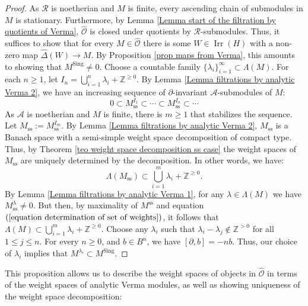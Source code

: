 \documentclass{amsart}
\newcommand{\OX}{\mathcal{O}}
\begin{document}
\begin{proof}
As $\mathscr{R}$ is noetherian and $M$ is finite, every ascending chain of submodules in $M$ is stationary. Furthermore, by Lemma \ref{Lemma start of the filtration by quotients of Verma}, $\widehat{\OX}$ is closed under quotients by $\mathscr{R}$-submodules. Thus, it suffices to show that for every $M\in \widehat{\OX}$ there is some $W\in\operatorname{Irr}(H)$ with a non-zero map $\widehat{\Delta}(W)\rightarrow M$. By Proposition \ref{prop maps from Verma}, this amounts to showing that $M^{\operatorname{Sing}}\neq 0$. Choose a countable family $\{\lambda_i\}_{i=1}^{\infty}\subset \Lambda(M)$. For each $n\geq 1$, let $I_n=\bigcup_{i=1}^n\lambda_i+ \mathbb{Z}^{\geq 0}$. By Lemma \ref{Lemma filtrations by analytic Verma 2}, we have an increasing sequence of $\partial$-invariant    $\mathscr{A}$-submodules of $M$:
\begin{equation*}
   0 \subset M_{\operatorname{ss}}^{I_1}\subset \cdots \subset M_{\operatorname{ss}}^{I_n}\subset \cdots
\end{equation*}
As $\mathscr{A}$ is noetherian and $M$ is finite, there is $m\geq 1$ that  stabilizes the sequence. Let $M_{\operatorname{ss}}:=M_{\operatorname{ss}}^{I_m}$. By Lemma \ref{Lemma filtrations by analytic Verma 2},  $M_{\operatorname{ss}}$ is a Banach space with a semi-simple weight space decomposition of compact type. Thus, by Theorem \ref{teo weight space decomposition ss case} the weight spaces of $M_{\operatorname{ss}}$ are uniquely determined by the decomposition. In other words, we have:
\begin{equation}\label{equation determination of set of weights}
    \Lambda(M_{\operatorname{ss}})\subset \bigcup_{i=1}^m\lambda_i+\mathbb{Z}^{\geq 0}.
\end{equation}
By Lemma \ref{Lemma filtrations by analytic Verma 1}, for any $\lambda \in \Lambda(M)$ we have $M_{\operatorname{ss}}^{\lambda}\neq 0$. But then, by maximality of $M^{\operatorname{ss}}$ and equation $(\ref{equation determination of set of weights})$, it follows that $\Lambda(M)\subset \bigcup_{i=1}^m\lambda_i+\mathbb{Z}^{\geq 0}$. Choose any $\lambda_i$ such that $\lambda_i-\lambda_j \not\in \mathbb{Z}^{> 0}$ for all $1\leq j \leq n$. For every $n\geq 0$, and $b\in B^n$, we have $[\partial,b]=-nb$. Thus, our choice of $\lambda_i$ implies that $M^{\lambda_i}\subset M^{\operatorname{Sing}}$.
\end{proof}
This proposition allows us to describe the weight spaces of objects in $\widehat{\OX}$ in terms of the weight spaces of analytic Verma modules, as well as showing uniqueness of the weight space decomposition:
\end{document}

